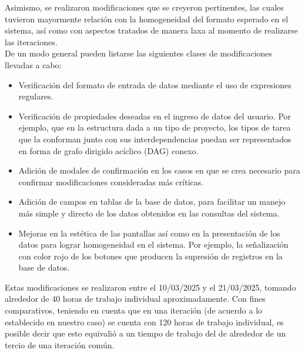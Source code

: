 \documentclass[a4paper, 12pt,twoside]{report}  %
\numberwithin{equation}{subsection} %
\begin{document}
Asimismo, se realizaron modificaciones que se creyeron pertinentes, las cuales tuvieron mayormente relación con la homogeneidad del formato esperado en el sistema, así como con aspectos tratados de manera laxa al momento de realizarse las iteraciones.\\
\indent De un modo general pueden listarse las siguientes clases de modificaciones llevadas a cabo:
\begin{itemize}
	\item Verificación del formato de entrada de datos mediante el uso de expresiones regulares.
	\item Verificación de propiedades deseadas en el ingreso de datos del usuario. Por ejemplo, que en la estructura dada a un tipo de proyecto, los tipos de tarea que la conforman junto con sus interdependencias puedan ser representados en forma de grafo dirigido acíclico (DAG) conexo.
	\item Adición de modales de confirmación en los casos en que se crea necesario para confirmar modificaciones consideradas más críticas.
	\item Adición de campos en tablas de la base de datos, para facilitar un manejo más simple y directo de los datos obtenidos en las consultas del sistema.
	\item Mejoras en la estética de las pantallas así como en la presentación de los datos para lograr homogeneidad en el sistema. Por ejemplo, la señalización con color rojo de los botones que producen la supresión de registros en la base de datos.
\end{itemize}
\indent Estas modificaciones se realizaron entre el 10/03/2025 y el 21/03/2025, tomando alrededor de 40 horas de trabajo individual aproximadamente. Con fines comparativos, teniendo en cuenta que en una iteración (de acuerdo a lo establecido en nuestro caso) se cuenta con 120 horas de trabajo individual, es posible decir que esto equivalió a un tiempo de trabajo del de alrededor de un tercio de una iteración común.
\end{document}
